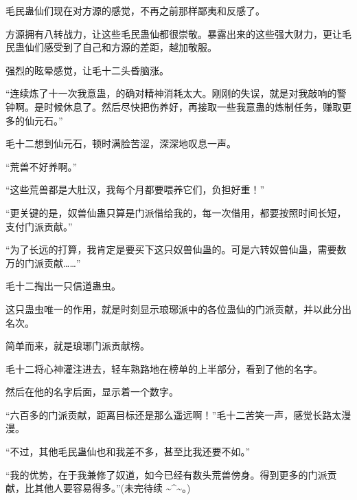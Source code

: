 \begin{this_body}
毛民蛊仙们现在对方源的感觉，不再之前那样鄙夷和反感了。

方源拥有八转战力，让这些毛民蛊仙都很崇敬。暴露出来的这些强大财力，更让毛民蛊仙们感受到了自己和方源的差距，越加敬服。

强烈的眩晕感觉，让毛十二头昏脑涨。

“连续炼了十一次我意蛊，的确对精神消耗太大。刚刚的失误，就是对我敲响的警钟啊。是时候休息了。然后尽快把伤养好，再接取一些我意蛊的炼制任务，赚取更多的仙元石。”

毛十二想到仙元石，顿时满脸苦涩，深深地叹息一声。

“荒兽不好养啊。”

“这些荒兽都是大肚汉，我每个月都要喂养它们，负担好重！”

“更关键的是，奴兽仙蛊只算是门派借给我的，每一次借用，都要按照时间长短，支付门派贡献。”

“为了长远的打算，我肯定是要买下这只奴兽仙蛊的。可是六转奴兽仙蛊，需要数万的门派贡献……”

毛十二掏出一只信道蛊虫。

这只蛊虫唯一的作用，就是时刻显示琅琊派中的各位蛊仙的门派贡献，并以此分出名次。

简单而来，就是琅琊门派贡献榜。

毛十二将心神灌注进去，轻车熟路地在榜单的上半部分，看到了他的名字。

然后在他的名字后面，显示着一个数字。

“六百多的门派贡献，距离目标还是那么遥远啊！”毛十二苦笑一声，感觉长路太漫漫。

“不过，其他毛民蛊仙也和我差不多，甚至比我还要不如。”

“我的优势，在于我兼修了奴道，如今已经有数头荒兽傍身。得到更多的门派贡献，比其他人要容易得多。”(未完待续 \~{}\^{}\~{}。)

\end{this_body}

